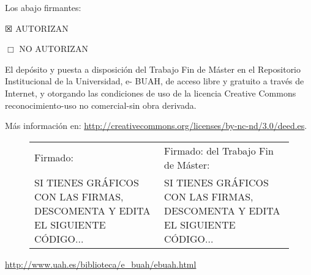Los abajo firmantes:

$\XBox$ AUTORIZAN

$\Box$ NO AUTORIZAN

\vspace{1cm}

\noindent El depósito y puesta a disposición del Trabajo Fin de Máster en el
Repositorio Institucional de la Universidad, e- BUAH, de acceso libre y
gratuito a través de Internet, y otorgando las condiciones de uso de la
licencia Creative Commons reconocimiento-uso no comercial-sin obra
derivada.

\noindent Más información en: \url{http://creativecommons.org/licenses/by-nc-nd/3.0/deed.es}.

\vspace{1cm}


\begin{figure}[H]
  \begin{tabular}{|p{}|p{}|}
    \hline
    \footnotesize{Firmado: \expandafter\makefirstuc\expandafter{\mybookAutorElOrLa} \mybookAutorOrAutora{}} & Firmado: \footnotesize{\mybookElOrLos{} \mybookTutorOrTutores{} del Trabajo Fin de Máster:}\\

  SI TIENES GRÁFICOS CON LAS FIRMAS, DESCOMENTA Y EDITA EL SIGUIENTE
  CÓDIGO...
& 
  SI TIENES GRÁFICOS CON LAS FIRMAS, DESCOMENTA Y EDITA EL SIGUIENTE
  CÓDIGO...
 \\
    \hline
  \end{tabular}
\end{figure}

\vspace{1cm}
\noindent \url{http://www.uah.es/biblioteca/e\_buah/ebuah.html}



